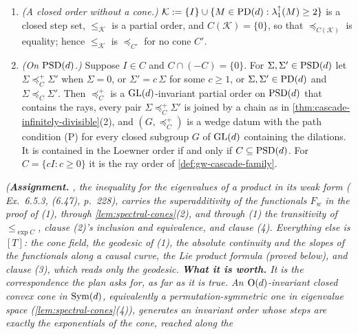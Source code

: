 \begin{theorem}
\begin{enumerate}
skew-symmetric matrix; $C(\mathcal K)$ is an $\Orth(d)$-invariant closed convex cone with
$C(\mathcal K) \cap (-C(\mathcal K)) = \{0\}$; and $\preceq_{C(\mathcal K)}$ is contained in
$\le_{\mathcal K}$. The following are equivalent: (a) $\le_{\mathcal K}$ is $\preceq_{C'}$ for some cone
$C'$ as above; (b) $\mathcal K = \exp C(\mathcal K)$; (c) $M^\tau \in \mathcal K$ whenever
$M \in \mathcal K$ and $0 \le \tau \le 1$. When they hold, $C' = C(\mathcal K)$.
\item \emph{(A closed order without a cone.)} $\mathcal K := \{I\} \cup \{M \in \mathrm{PD}(d) :
\lambda^\uparrow_1(M) \ge 2\}$ is a closed step set, $\le_{\mathcal K}$ is a partial order, and
$C(\mathcal K) = \{0\}$, so that $\preceq_{C(\mathcal K)}$ is equality; hence $\le_{\mathcal K}$ is
$\preceq_{C'}$ for no cone $C'$.
\item \emph{(On $\mathrm{PSD}(d)$.)} Suppose $I \in C$ and $C \cap (-C) = \{0\}$. For $\Sigma, \Sigma' \in
\mathrm{PSD}(d)$ let $\Sigma \preceq^+_C \Sigma'$ when $\Sigma = 0$, or $\Sigma' = c\,\Sigma$ for some $c \ge 1$,
or $\Sigma, \Sigma' \in \mathrm{PD}(d)$ and $\Sigma \preceq_C \Sigma'$. Then $\preceq^+_C$ is a $\mathrm{GL}(d)$-invariant
partial order on $\mathrm{PSD}(d)$ that contains the rays, every pair $\Sigma \preceq^+_C \Sigma'$ is joined by a
chain as in \ref{thm:cascade-infinitely-divisible}(2), and $(G, \preceq^+_C)$ is a wedge datum with the
path condition (P) for every closed subgroup $G$ of $\mathrm{GL}(d)$ containing the dilations. It is contained in
the Loewner order if and only if $C \subseteq \mathrm{PSD}(d)$. For $C = \{cI : c \ge 0\}$ it is the ray order of
\ref{def:gw-cascade-family}.
\end{enumerate}
\statusA\quad{}\quad\emph{(\textbf{Assignment.} , the inequality for the
eigenvalues of a product in its weak form ( Ex.~6.5.3, (6.47), p.~228), carries the
superadditivity of the functionals $F_w$ in the proof of (1), through \ref{lem:spectral-cones}(2), and
through (1) the transitivity of $\le_{\exp C}$, clause (2)'s inclusion and equivalence, and clause (4).
Everything else is $[T]$: the cone field, the geodesic of (1), the absolute continuity and the slopes of
the functionals along a causal curve, the Lie product formula (proved below), and clause (3), which reads
only the geodesic. \textbf{What it is worth.} It is the
correspondence the plan asks for, as far as it is true. An $\Orth(d)$-invariant closed convex cone in
$\mathrm{Sym}(d)$, equivalently a permutation-symmetric one in eigenvalue space (\ref{lem:spectral-cones}(4)),
generates an invariant order whose steps are exactly the exponentials of the cone, reached along the
}
\end{theorem}
